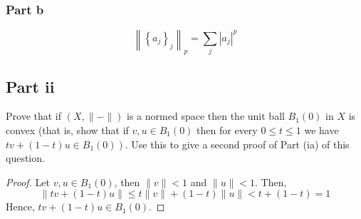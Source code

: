 \subsubsection{Part b}

\begin{question}
    \begin{equation}
        \left\|\left\{a_j\right\}_j\right\|_p=\sum_j\left|a_j\right|^p
    \end{equation}
\end{question}

\subsection{Part ii}

\begin{question}
    Prove that if $(X,\|-\|)$ is a normed space then the unit ball $B_1(0)$ in $X$ is convex (that is, show that if $v, u \in B_1(0)$ then for every $0 \leq t \leq 1$ we have $\left.t v+(1-t) u \in B_1(0)\right)$. Use this to give a second proof of Part (ia) of this question.
\end{question}

\begin{answer}
    \begin{proof}
        Let $v,u \in B_1(0)$, then $\lVert v \rVert < 1$ and $\lVert u \rVert < 1$. Then, 
        \begin{equation}
            \lVert tv + (1-t)u \rVert \leq t \lVert v \rVert + (1-t)\lVert u \rVert < t + (1-t) = 1
        \end{equation}
        Hence, $tv+(1-t)u \in B_1(0)$. 
    \end{proof}
\end{answer}
